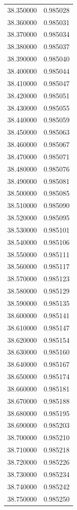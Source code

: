 \begin{tabular}{rr}
38.350000 & 0.985028 \\
38.360000 & 0.985031 \\
38.370000 & 0.985034 \\
38.380000 & 0.985037 \\
38.390000 & 0.985040 \\
38.400000 & 0.985044 \\
38.410000 & 0.985047 \\
38.420000 & 0.985051 \\
38.430000 & 0.985055 \\
38.440000 & 0.985059 \\
38.450000 & 0.985063 \\
38.460000 & 0.985067 \\
38.470000 & 0.985071 \\
38.480000 & 0.985076 \\
38.490000 & 0.985081 \\
38.500000 & 0.985085 \\
38.510000 & 0.985090 \\
38.520000 & 0.985095 \\
38.530000 & 0.985101 \\
38.540000 & 0.985106 \\
38.550000 & 0.985111 \\
38.560000 & 0.985117 \\
38.570000 & 0.985123 \\
38.580000 & 0.985129 \\
38.590000 & 0.985135 \\
38.600000 & 0.985141 \\
38.610000 & 0.985147 \\
38.620000 & 0.985154 \\
38.630000 & 0.985160 \\
38.640000 & 0.985167 \\
38.650000 & 0.985174 \\
38.660000 & 0.985181 \\
38.670000 & 0.985188 \\
38.680000 & 0.985195 \\
38.690000 & 0.985203 \\
38.700000 & 0.985210 \\
38.710000 & 0.985218 \\
38.720000 & 0.985226 \\
38.730000 & 0.985234 \\
38.740000 & 0.985242 \\
38.750000 & 0.985250 \\

\end{tabular}
